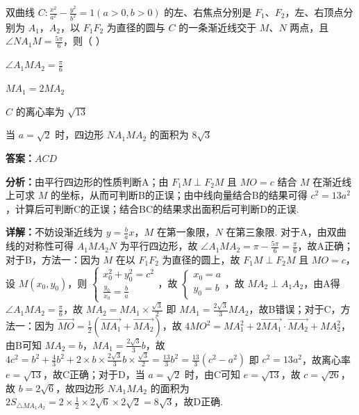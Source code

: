 \begin{question}[points=6]
双曲线 $C:\frac{x^2}{a^2}-\frac{y^2}{b^2}=1(a>0,b>0)$ 的左、右焦点分别是 $F_1$、$F_2$，左、右顶点分别为 $A_1$，$A_2$，以 $F_1F_2$ 为直径的圆与 $C$ 的一条渐近线交于 $M$、$N$ 两点，且 $\angle NA_1M=\frac{5\pi}{6}$，则（ ）
\begin{choices}
  \item $\angle A_1MA_2=\frac{\pi}{6}$
  \item $MA_1=2MA_2$
  \item $C$ 的离心率为 $\sqrt{13}$
  \item 当 $a=\sqrt{2}$ 时，四边形 $NA_1MA_2$ 的面积为 $8\sqrt{3}$
\end{choices}
\begin{solution}
\textbf{答案：}$ACD$

\textbf{分析：}由平行四边形的性质判断A；由 $F_1M\perp F_2M$ 且 $MO=c$ 结合 $M$ 在渐近线上可求 $M$ 的坐标，从而可判断B的正误；由中线向量结合B的结果可得 $c^2=13a^2$，计算后可判断C的正误；结合BC的结果求出面积后可判断D的正误.

\textbf{详解：}不妨设渐近线为 $y=\frac{b}{a}x$，$M$ 在第一象限，$N$ 在第三象限. 对于A，由双曲线的对称性可得 $A_1MA_2N$ 为平行四边形，故 $\angle A_1MA_2=\pi-\frac{5\pi}{6}=\frac{\pi}{6}$，故A正确；对于B，方法一：因为 $M$ 在以 $F_1F_2$ 为直径的圆上，故 $F_1M\perp F_2M$ 且 $MO=c$，设 $M(x_0,y_0)$，则 $\begin{cases}x_0^2+y_0^2=c^2\\\frac{y_0}{x_0}=\frac{b}{a}\end{cases}$，故 $\begin{cases}x_0=a\\y_0=b\end{cases}$，故 $MA_2\perp A_1A_2$，由A得 $\angle A_1MA_2=\frac{\pi}{6}$，故 $MA_2=MA_1\times\frac{\sqrt{3}}{2}$ 即 $MA_1=\frac{2\sqrt{3}}{3}MA_2$，故B错误；对于C，方法一：因为 $\overrightarrow{MO}=\frac{1}{2}(\overrightarrow{MA_1}+\overrightarrow{MA_2})$，故 $4MO^2=MA_1^2+2\overrightarrow{MA_1}\cdot\overrightarrow{MA_2}+MA_2^2$，由B可知 $MA_2=b$，$MA_1=\frac{2\sqrt{3}}{3}b$，故 $4c^2=b^2+\frac{4}{3}b^2+2\times b\times\frac{2\sqrt{3}}{3}b\times\frac{\sqrt{3}}{2}=\frac{13}{3}b^2=\frac{13}{3}(c^2-a^2)$ 即 $c^2=13a^2$，故离心率 $e=\sqrt{13}$，故C正确；对于D，当 $a=\sqrt{2}$ 时，由C可知 $e=\sqrt{13}$，故 $c=\sqrt{26}$，故 $b=2\sqrt{6}$，故四边形 $NA_1MA_2$ 的面积为 $2S_{\triangle MA_1A_2}=2\times\frac{1}{2}\times2\sqrt{6}\times2\sqrt{2}=8\sqrt{3}$，故D正确.
\end{solution}
\end{question}

